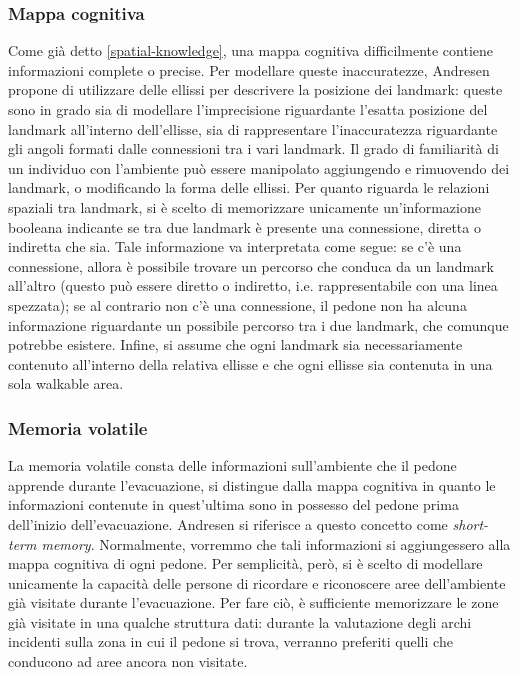 \documentclass[12pt,a4paper,openright,oneside]{book}
\begin{document}
\subsubsection{Mappa cognitiva}
Come già detto \ref{spatial-knowledge}, una mappa cognitiva difficilmente contiene informazioni complete o precise. Per modellare queste inaccuratezze, Andresen \cite{Andresen2018} propone di utilizzare delle ellissi per descrivere la posizione dei landmark: queste sono in grado sia di modellare l’imprecisione riguardante l’esatta posizione del landmark all’interno dell’ellisse, sia di rappresentare l’inaccuratezza riguardante gli angoli formati dalle connessioni tra i vari landmark. Il grado di familiarità di un individuo con l’ambiente può essere manipolato aggiungendo e rimuovendo dei landmark, o modificando la forma delle ellissi. Per quanto riguarda le relazioni spaziali tra landmark, si è scelto di memorizzare unicamente un’informazione booleana indicante se tra due landmark è presente una connessione, diretta o indiretta che sia. Tale informazione va interpretata come segue: se c’è una connessione, allora è possibile trovare un percorso che conduca da un landmark all’altro (questo può essere diretto o indiretto, i.e. rappresentabile con una linea spezzata); se al contrario non c’è una connessione, il pedone non ha alcuna informazione riguardante un possibile percorso tra i due landmark, che comunque potrebbe esistere. Infine, si assume che ogni landmark sia necessariamente contenuto all’interno della relativa ellisse e che ogni ellisse sia contenuta in una sola walkable area.

\subsubsection{Memoria volatile}
La memoria volatile consta delle informazioni sull’ambiente che il pedone apprende durante l’evacuazione, si distingue dalla mappa cognitiva in quanto le informazioni contenute in quest’ultima sono in possesso del pedone prima dell’inizio dell’evacuazione. Andresen \cite{Andresen2018} si riferisce a questo concetto come \emph{short-term memory}. Normalmente, vorremmo che tali informazioni si aggiungessero alla mappa cognitiva di ogni pedone. Per semplicità, però, si è scelto di modellare unicamente la capacità delle persone di ricordare e riconoscere aree dell’ambiente già visitate durante l’evacuazione. Per fare ciò, è sufficiente memorizzare le zone già visitate in una qualche struttura dati: durante la valutazione degli archi incidenti sulla zona in cui il pedone si trova, verranno preferiti quelli che conducono ad aree ancora non visitate.
\end{document}
